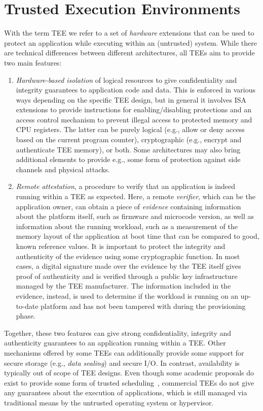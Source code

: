 \section{Trusted Execution Environments}
\label{thesis:intro-cc}

With the term \acl{TEE} we refer to a set of \emph{hardware} extensions that can
be used to protect an application while executing within an (untrusted) system.
While there are technical differences between different architectures, all
\acp{TEE} aim to provide two main features:
%
\begin{enumerate}
    \item \emph{Hardware-based isolation} of logical resources to give
    confidentiality and integrity guarantees to application code and data. This
    is enforced in various ways depending on the specific \ac{TEE} design, but
    in general it involves ISA extensions to provide instructions for
    enabling/disabling protections and an access control mechanism to prevent
    illegal access to protected memory and CPU registers. The latter can be
    purely logical (e.g., allow or deny access based on the current program
    counter), cryptographic (e.g., encrypt and authenticate \ac{TEE} memory), or
    both. Some architectures may also bring additional elements to provide e.g.,
    some form of protection against side channels and physical attacks.
    \item \emph{Remote attestation}, a procedure to verify that an application
    is indeed running within a \ac{TEE} as expected. Here, a remote
    \emph{verifier}, which can be the application owner, can obtain a piece of
    \emph{evidence} containing information about the platform itself, such as
    firmware and microcode version, as well as information about the running
    workload, such as a measurement of the memory layout of the application at
    boot time that can be compared to good, known reference values. It is
    important to protect the integrity and authenticity of the evidence using
    some cryptographic function. In most cases, a digital signature made over
    the evidence by the \ac{TEE} itself gives proof of authenticity and is
    verified through a public key infrastructure managed by the \ac{TEE}
    manufacturer. The information included in the evidence, instead, is used to
    determine if the workload is running on an up-to-date platform and has not
    been tampered with during the provisioning phase.
\end{enumerate}

Together, these two features can give strong confidentiality, integrity and
authenticity guarantees to an application running within a \ac{TEE}. Other
mechanisms offered by some \acp{TEE} can additionally provide some support for
secure storage (e.g., \emph{data sealing}) and secure I/O. In contrast,
availability is typically out of scope of \ac{TEE} designs. Even though some
academic proposals do exist to provide some form of trusted
scheduling~\cite{alder_2021_aion}, commercial \acp{TEE} do not give any
guarantees about the execution of applications, which is still managed via
traditional means by the untrusted operating system or hypervisor.


